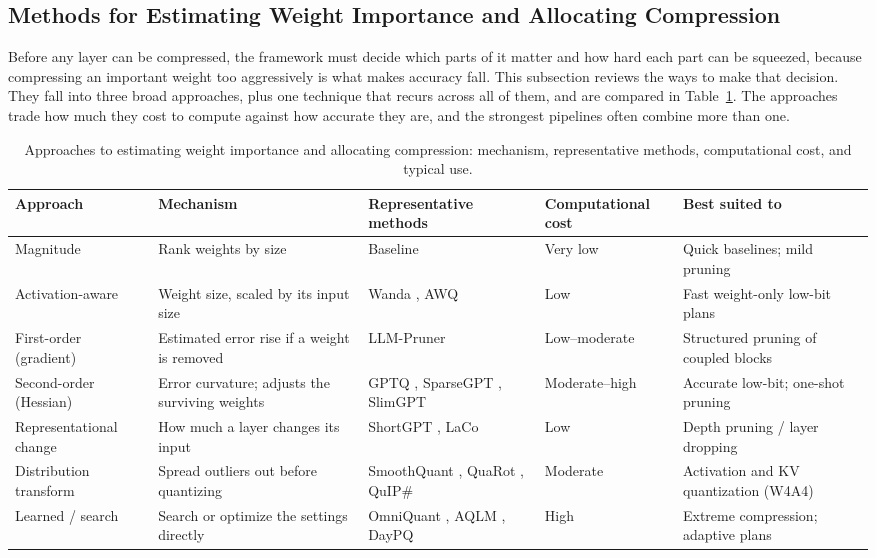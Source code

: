 \documentclass[
11pt, %
english, %
singlespacing, %
headsepline, %
]{MastersDoctoralThesis} %
\begin{document}
\subsection{Methods for Estimating Weight Importance and Allocating Compression}

Before any layer can be compressed, the framework must decide which parts of it matter and how hard each part can be squeezed, because compressing an important weight too aggressively is what makes accuracy fall. This subsection reviews the ways to make that decision. They fall into three broad approaches, plus one technique that recurs across all of them, and are compared in Table~\ref{tab:lr-importance}. The approaches trade how much they cost to compute against how accurate they are, and the strongest pipelines often combine more than one.

\begin{table}[htbp]
\centering
\scriptsize
\caption{Approaches to estimating weight importance and allocating compression: mechanism, representative methods, computational cost, and typical use.}
\label{tab:lr-importance}
\renewcommand{\arraystretch}{1.2}
\begin{tabular}{p{}p{}p{}p{}p{}}
\hline
\textbf{Approach} & \textbf{Mechanism} & \textbf{Representative methods} & \textbf{Computational cost} & \textbf{Best suited to} \\
\hline
Magnitude & Rank weights by size & Baseline & Very low & Quick baselines; mild pruning \\
Activation-aware & Weight size, scaled by its input size & Wanda \cite{sun2024wanda}, AWQ \cite{lin2024awq} & Low & Fast weight-only low-bit plans \\
First-order (gradient) & Estimated error rise if a weight is removed & LLM-Pruner \cite{ma2023llmpruner} & Low--moderate & Structured pruning of coupled blocks \\
Second-order (Hessian) & Error curvature; adjusts the surviving weights & GPTQ \cite{frantar2023gptq}, SparseGPT \cite{frantar2023sparsegpt}, SlimGPT \cite{ling2024slimgpt} & Moderate--high & Accurate low-bit; one-shot pruning \\
Representational change & How much a layer changes its input & ShortGPT \cite{men2024shortgpt}, LaCo \cite{yang2024laco} & Low & Depth pruning / layer dropping \\
Distribution transform & Spread outliers out before quantizing & SmoothQuant \cite{xiao2023smoothquant}, QuaRot \cite{ashkboos2024quarot}, QuIP\# \cite{tseng2024quipsharp} & Moderate & Activation and KV quantization (W4A4) \\
Learned / search & Search or optimize the settings directly & OmniQuant \cite{shao2024omniquant}, AQLM \cite{egiazarian2024aqlm}, DayPQ \cite{xu2026daypq} & High & Extreme compression; adaptive plans \\
\hline
\end{tabular}
\end{table}
\end{document}
